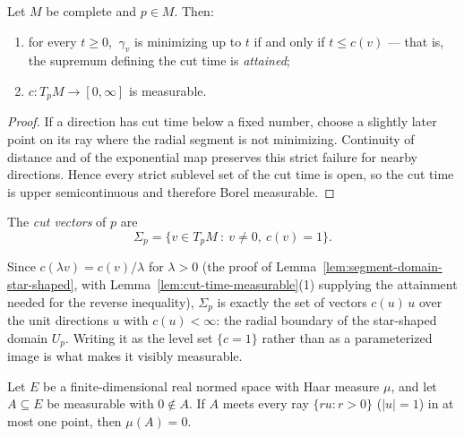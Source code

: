 \begin{lemma}
\label{lem:cut-time-measurable}
\leanok



Let $M$ be complete and $p\in M$. Then:
\begin{enumerate}
\item for every $t\ge0$, $\ \gamma_v$ is minimizing up to $t$ if and
only if $t\le c(v)$ --- that is, the supremum defining the cut time is
\emph{attained};
\item $c\colon T_pM\to[0,\infty]$ is measurable.
\end{enumerate}
\end{lemma}

\begin{proof}
\sketch
{}
\leanok
If a direction has cut time below a fixed number, choose a slightly later point on its ray where the radial segment is not minimizing. Continuity of distance and of the exponential map preserves this strict failure for nearby directions. Hence every strict sublevel set of the cut time is open, so the cut time is upper semicontinuous and therefore Borel measurable.
\end{proof}

\begin{definition}
\label{def:cut-vectors}
\leanok



The \emph{cut vectors} of $p$ are
$$\Sigma_p=\{v\in T_pM\ :\ v\neq0,\ c(v)=1\}.$$
\end{definition}

Since $c(\lambda v)=c(v)/\lambda$ for $\lambda>0$ (the proof of
Lemma~\ref{lem:segment-domain-star-shaped}, with
Lemma~\ref{lem:cut-time-measurable}(1) supplying the attainment needed
for the reverse inequality), $\Sigma_p$ is exactly the set of vectors
$c(u)\,u$ over the unit directions $u$ with $c(u)<\infty$: the radial
boundary of the star-shaped domain $U_p$. Writing it as the level set
$\{c=1\}$ rather than as a parameterized image is what makes it
visibly measurable.

\begin{lemma}
\label{lem:radial-graph-null}
\leanok


Let $E$ be a finite-dimensional real normed space with Haar measure
$\mu$, and let $A\subseteq E$ be measurable with $0\notin A$. If $A$
meets every ray $\{ru : r>0\}$ ($\lvert u\rvert=1$) in at most one
point, then $\mu(A)=0$.
\end{lemma}

